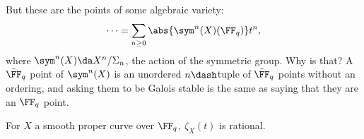 But these are the points of some algebraic variety:
\begin{align*}  
\cdots 
= \sum_{n\geq 0} \abs{\sym^n(X)(\FF_q)} t^n
,\end{align*} where \(\sym^n(X) \da X^n/\Sigma_n\), the action of the
symmetric group. Why is that? A \(\bar \FF_q\) point of \(\sym^n(X)\) is
an unordered \(n\dash\)tuple of \(\bar \FF_q\) points without an
ordering, and asking them to be Galois stable is the same as saying that
they are an \(\FF_q\) point.

\begin{theorem}

For \(X\) a smooth proper curve over \(\FF_q\), \(\zeta_X(t)\) is
rational.

\end{theorem}


